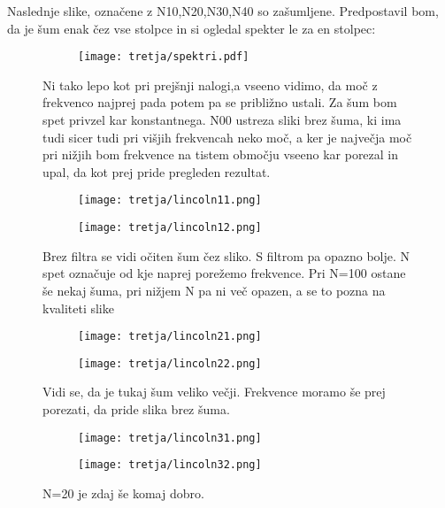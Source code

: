 \documentclass{article}
\begin{document}
Naslednje slike, označene z N10,N20,N30,N40 so zašumljene. Predpostavil bom, da je šum enak čez vse stolpce in si ogledal spekter le za en stolpec:

\begin{figure}[H]
\centering
\begin{subfigure}{.6\textwidth}
\texttt{[image: tretja/spektri.pdf]}
\end{subfigure}
\caption*{Ni tako lepo kot pri prejšnji nalogi,a  vseeno vidimo, da moč z frekvenco najprej pada potem pa se približno ustali. Za šum bom spet privzel kar konstantnega. N00 ustreza sliki brez šuma, ki ima tudi sicer tudi pri višjih frekvencah neko moč, a ker je največja moč pri nižjih bom frekvence na tistem območju vseeno kar porezal in upal, da kot prej pride pregleden rezultat.}
\end{figure}

\begin{figure}[H]
\centering
\begin{subfigure}{.9\textwidth}
\texttt{[image: tretja/lincoln11.png]}
\end{subfigure}
\begin{subfigure}{.9\textwidth}
\texttt{[image: tretja/lincoln12.png]}
\end{subfigure}
\caption*{Brez filtra se vidi očiten šum čez sliko. S filtrom pa opazno bolje. N spet označuje od kje naprej porežemo frekvence. Pri N=100 ostane še nekaj šuma, pri nižjem N pa ni več opazen, a se to pozna na kvaliteti slike}
\end{figure}

\begin{figure}[H]
\centering
\begin{subfigure}{.9\textwidth}
\texttt{[image: tretja/lincoln21.png]}
\end{subfigure}
\begin{subfigure}{.9\textwidth}
\texttt{[image: tretja/lincoln22.png]}
\end{subfigure}
\caption*{Vidi se, da je tukaj šum veliko večji. Frekvence moramo še prej porezati, da pride slika brez šuma.}
\end{figure}

\begin{figure}[H]
\centering
\begin{subfigure}{.9\textwidth}
\texttt{[image: tretja/lincoln31.png]}
\end{subfigure}
\begin{subfigure}{.9\textwidth}
\texttt{[image: tretja/lincoln32.png]}
\end{subfigure}
\caption*{N=20 je zdaj še komaj dobro.}
\end{figure}
\end{document}
